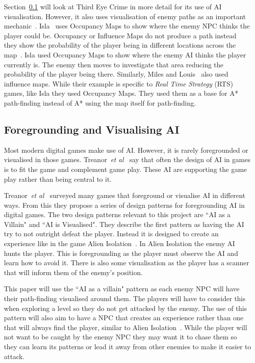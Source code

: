 \documentclass[journal]{IEEEtran}
\begin{document}
Section~\ref{VisualisingAI} will look at Third Eye Crime in more detail for its use of AI visualisation. However, it also uses visualisation of enemy paths as an important mechanic~\cite{Isla2014, game:ThirdEyeCrime}.  Isla~\cite{Isla2014} uses Occupancy Maps to show where the enemy NPC thinks the player could be. Occupancy or Influence Maps do not produce a path instead they show the probability of the player being in different locations across the map~\cite{Isla2014, Miles2006}. Isla used Occupancy Maps to show where the enemy AI thinks the player currently is. The enemy then moves to investigate that area reducing the probability of the player being there.  Similarly, Miles and Louis~\cite{Miles2006} also used influence maps. While their example is specific to \textit{Real Time Strategy} (RTS) games, like Isla they used Occupancy Maps.  They used them as a base for A* path-finding instead of A* using the map itself for path-finding.


\subsection{Foregrounding and Visualising AI} \label{VisualisingAI}
Most modern digital games make use of AI.  However, it is rarely foregrounded or visualised in those games. Treanor~\textit{et al}~\cite{treanor2015} say that often the design of AI in games is to fit the game and complement game play. These AI are supporting the game play rather than being central to it.

Treanor~\textit{et al}~\cite{treanor2015} surveyed many games that foreground or visualise AI in different ways.   From this they propose a series of design patterns for foregrounding AI in digital games. 
The two design patterns relevant to this project are ``AI as a Villain" and ``AI is Visualised".  They describe the first pattern as having the AI try to not outright defeat the player. Instead it is designed to create an experience like in the game Alien Isolation~\cite{treanor2015,game:AlienIsolation}.  In Alien Isolation the enemy AI hunts the player. This is foregrounding as the player must observe the AI and learn how to avoid it. There is also some visualisation as the player has a scanner that will inform them of the enemy's position. 

This paper will use the ``AI as a villain" pattern as each enemy NPC will have their path-finding visualised around them. The players will have to consider this when exploring a level so they do not get attacked by the enemy. The use of this pattern will also aim to have a NPC that creates an experience rather than one that will always find the player, similar to Alien Isolation~\cite{game:AlienIsolation,treanor2015}. While the player will not want to be caught by the enemy NPC they may want it to chase them so they can learn its patterns or lead it away from other enemies to make it easier to attack. 
\end{document}

